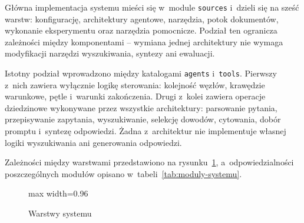Główna implementacja systemu mieści się w~module \texttt{sources} i~dzieli się
na sześć warstw: konfigurację, architektury agentowe, narzędzia, potok
dokumentów, wykonanie eksperymentu oraz narzędzia pomocnicze. Podział ten
ogranicza zależności między komponentami -- wymiana jednej architektury nie
wymaga modyfikacji narzędzi wyszukiwania, syntezy ani ewaluacji.

Istotny podział wprowadzono między katalogami \texttt{agents} i~\texttt{tools}.
Pierwszy z~nich zawiera wyłącznie logikę sterowania: kolejność węzłów,
krawędzie warunkowe, pętle i~warunki zakończenia. Drugi z~kolei zawiera
operacje dziedzinowe wykonywane przez wszystkie architektury: parsowanie
pytania, przepisywanie zapytania, wyszukiwanie, selekcję dowodów, cytowania,
dobór promptu i~syntezę odpowiedzi. Żadna z~architektur nie implementuje
własnej logiki wyszukiwania ani generowania odpowiedzi.

Zależności między warstwami przedstawiono na rysunku~\ref{fig:warstwy-systemu},
a~odpowiedzialności poszczególnych modułów opisano
w~tabeli~\ref{tab:moduly-systemu}.

\begin{figure}[H]
  \caption{Warstwy systemu}\label{fig:warstwy-systemu}
  \centering
  \begin{adjustbox}{max width=0.96\textwidth}
  \end{adjustbox}
\end{figure}


